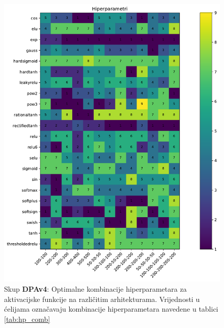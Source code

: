 \documentclass[times, utf8, numeric, diplomski]{fer}
\begin{document}
\begin{figure}[H]
\includegraphics[width=\textwidth]{greedy_9_hp.pdf}
\centering
\caption{Skup \textbf{DPAv4}: Optimalne kombinacije hiperparametara za aktivacijske funkcije na različitim arhitekturama. Vrijednosti u ćelijama označavaju kombinacije hiperparametara navedene u tablici \ref{tab:hp_comb}}
\label{fig:greedy_9_hp}
\end{figure}
\end{document}
